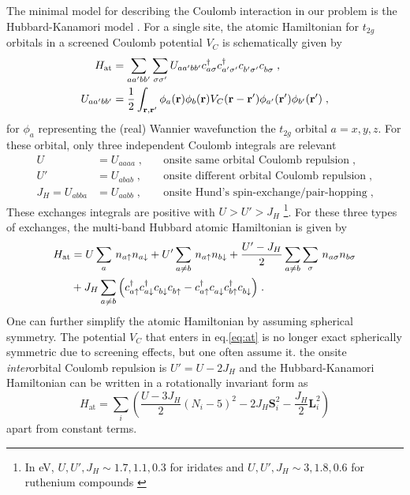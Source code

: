 The minimal model for describing the Coulomb interaction in our problem is the Hubbard-Kanamori model \cite{Kanamori_1963}.
For a single site, the atomic Hamiltonian for $t_{2g}$ orbitals in a screened Coulomb potential $V_C$ is schematically given by
\begin{equation}
\begin{split}
    H_{\mathrm{at}} &= \sum_{aa'bb'}\sum_{\sigma\sigma'}  U_{aa'bb'}c^\dagger_{a \sigma} c^\dagger_{a' \sigma'}  c^\pd_{b' \sigma'} c^\pd_{b \sigma} \; , \\
    U_{aa'bb'} &= \frac12 \int_{\mb r, \mb r '} \phi_{a}(\mb r) \phi_{b}(\mb r) V_{C}(\mb r -\mb r ') \phi_{a'}(\mb r') \phi_{b'}(\mb r') \; ,
    \label{eq:at}
\end{split}
\end{equation}
for $ \phi_{a}$ representing the (real) Wannier wavefunction the $t_{2g}$ orbital $a=x,y,z$. For these orbital, only three independent Coulomb integrals are relevant \cite{Georges_2013,Triebl_2018} %
\begin{eqnarray}
        U\!&=U_{aaaa}\; , \quad & \text{onsite same orbital  Coulomb repulsion} \; , \\
        U'\!&=U_{abab}\; , \quad & \text{onsite different orbital Coulomb repulsion} \; , \\
        J_H=U_{abba}\!&\!=U_{aabb}\; , \quad & \text{onsite Hund's spin-exchange/pair-hopping} \; ,
\end{eqnarray}
These exchanges integrals are positive with $U>U'>J_H$ \footnote{In eV, $U,U',J_H\!\sim\!1.7,1.1,0.3$ for iridates and $U,U',J_H\!\sim\! 3, 1.8, 0.6$ for ruthenium compounds \cite{Winter2017rev}}. For these three types of exchanges, the multi-band Hubbard atomic Hamiltonian is given by \cite{Kanamori_1963,Winter_2016}
\begin{equation}
    \begin{split}
        H_{\mathrm{at}} &=
        U \sum_a \,  n_{a\uparrow}n_{a\downarrow}
        +U' \sum_{a\neq b} \,  n_{a\uparrow}n_{b\downarrow}
        +\frac{U'-J_H}2 \sum_{a\neq b}\sum_\sigma \,  n_{a\sigma}n_{b\sigma} \\
        &+ J_H  \sum_{a\neq b} \Big(
        c^\dagger_{a \uparrow}c^\dagger_{a \downarrow}
        c^\pd_{b \downarrow}c^\pd_{b \uparrow}
        -
        c^\dagger_{a \uparrow}c^\pd_{a \downarrow}
        c^\dagger_{b \uparrow}c^\pd_{b \downarrow}\Big) \; .
    \end{split}
\end{equation}
One can further simplify the atomic Hamiltonian by assuming spherical symmetry.
The  potential $V_C$ that enters in eq.\eqref{eq:at} is no longer exact spherically symmetric due to screening effects, but one often assume it.
the onsite \textit{inter}orbital  Coulomb repulsion is $U'=U-2J_H$ and the Hubbard-Kanamori Hamiltonian can be written in a rotationally invariant form as \cite{Rau2014, Pereira2020}
\begin{equation}
     H_{\mathrm{at}} =\sum_i \left( \frac{U-3J_H}{2}(N_i-5)^2 - 2J_H \mathbf{S}_i^2 - \frac{J_H}{2} \mathbf{L}_i^2 \right) \label{eq:atomic_hubbard_kanamori_RAU}
\end{equation}
apart from constant terms.



